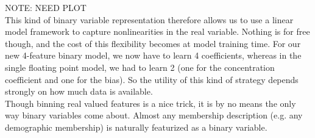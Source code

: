 NOTE: NEED PLOT\\



This kind of binary variable representation therefore allows us to use a linear model framework to capture nonlinearities in the real variable.  Nothing is for free though, and the cost of this flexibility becomes at model training time. For our new 4-feature binary model, we now have to learn 4 coefficients, whereas in the single floating point model, we had to learn 2 (one for the concentration coefficient and one for the bias).  So the utility of this kind of strategy depends strongly on how much data is available.
\\

Though binning real valued features is a nice trick, it is by no means the only way binary variables come about.  Almost any membership description (e.g. any demographic membership) is naturally featurized as a binary variable.


